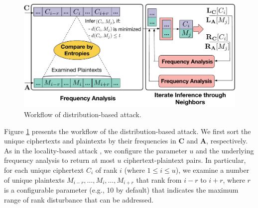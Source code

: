 \documentclass[bachelor]{thesis-uestc}
\begin{document}

\begin{figure}[t]
\centering
\includegraphics[width=.48\textwidth]{pic/distribution-attack.pdf}
\caption{Workflow of  distribution-based attack.}
\label{fig:distribution-attack}
\end{figure}

Figure \ref{fig:distribution-attack} presents the workflow of the
distribution-based attack. We first sort the unique ciphertexts and  plaintexts by
their frequencies in $\mathbf{C}$ and $\mathbf{A}$, respectively. As in the
locality-based attack \cite{li17}, we configure the parameter $u$ and 
the underlying frequency analysis to return at most $u$ ciphertext-plaintext
pairs.  In particular, for each unique ciphertext $C_i$ of rank $i$ (where 
$1 \leq i \leq u$), we examine a number of unique plaintexts $M_{i-r}, \ldots,
M_i, \ldots, M_{i+r}$ that rank from $i-r$ to $i+r$, where $r$ is a
configurable parameter (e.g., 10 by default) that indicates the maximum range
of rank disturbance that can be addressed. 
\end{document}
